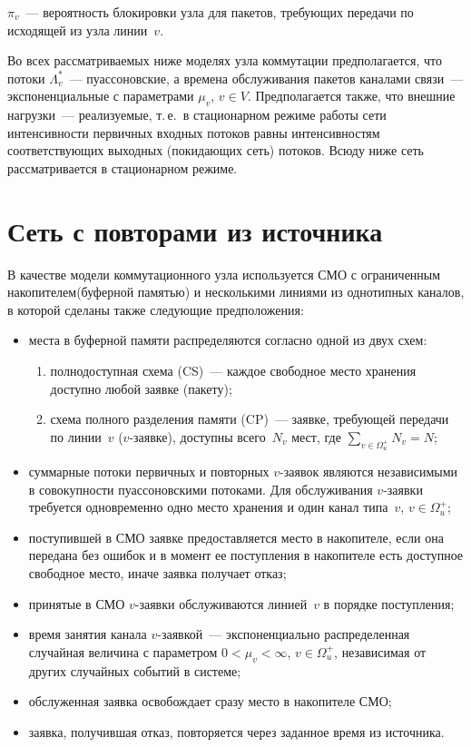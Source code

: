 \begin{multicols}{2}
     $\pi_v$~--- вероятность блокировки узла для пакетов, требующих 
передачи по исходящей из узла линии~$v$.
     
     Во всех рассматриваемых ниже моделях узла коммутации 
предполагается, что потоки $\Lambda_v^*$~--- пуассоновские, а времена 
обслуживания пакетов каналами связи~--- экспоненциальные с параметрами 
$\mu_v$, $v\in V$. Предполагается также, что внешние нагрузки~--- 
реализуемые, т.\,е.\ в стационарном режиме работы сети интенсивности 
первичных входных потоков равны интенсивностям соответствующих 
выходных (покидающих сеть) потоков. Всюду ниже сеть рассматривается в 
стационарном режиме.
     
\section{Сеть с повторами из источника}
     
     В качестве модели коммутационного узла используется СМО с 
ограниченным накопителем\linebreak (буферной памятью) и несколькими линиями из 
однотипных каналов, в которой сделаны также сле\-ду\-ющие предположения:
     \begin{itemize}
\item места в буферной памяти распределяются согласно одной из двух 
схем:
\begin{enumerate}[(1)]
\item полнодоступная схема (CS)~--- каждое свободное место хранения 
доступно любой заявке (пакету);
\item схема полного разделения памяти (CP)~--- заявке, требующей передачи 
по линии~$v$ ($v$-заявке), доступны всего~$N_v$ мест, где 
$\sum\limits_{v\in\Omega_u^+} N_v = N$;
\end{enumerate}
\item суммарные потоки первичных и повторных $v$-за\-явок являются 
независимыми в совокупности пуассоновскими потоками. Для 
обслуживания $v$-заявки требуется одновременно одно место хранения и 
один канал типа~$v$, $v\in\Omega_u^+$;
\item поступившей в СМО заявке предоставляется место в накопителе, если 
она передана без ошибок и в момент ее поступления в накопителе есть 
доступное свободное место, иначе заявка получает отказ;
\item принятые в СМО $v$-заявки обслуживаются линией~$v$ в порядке 
поступления;
\item время занятия канала $v$-заявкой~--- экспоненциально 
распределенная случайная величина с параметром $0<\mu_v<\infty$, $v\in 
\Omega_u^+$, независимая от других случайных событий в системе;
\item обслуженная заявка освобождает сразу место в накопителе СМО;
\item заявка, получившая отказ, повторяется через заданное время из 
источника.
\end{itemize}


\end{multicols}
